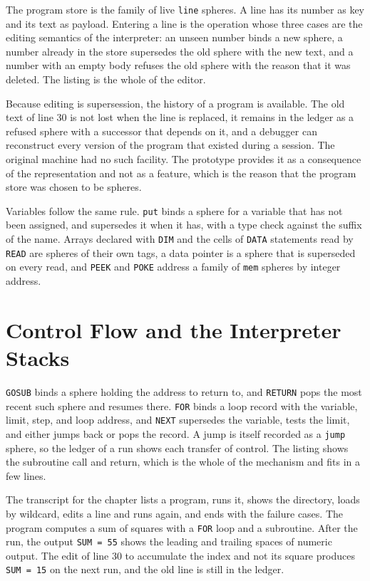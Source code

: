 The program store is the family of live \texttt{line} spheres. A line has its number as key and its text as payload. Entering a line is the operation whose three cases are the editing semantics of the interpreter: an unseen number binds a new sphere, a number already in the store supersedes the old sphere with the new text, and a number with an empty body refuses the old sphere with the reason that it was deleted. The listing is the whole of the editor.


Because editing is supersession, the history of a program is available. The old text of line 30 is not lost when the line is replaced, it remains in the ledger as a refused sphere with a successor that depends on it, and a debugger can reconstruct every version of the program that existed during a session. The original machine had no such facility. The prototype provides it as a consequence of the representation and not as a feature, which is the reason that the program store was chosen to be spheres.

Variables follow the same rule. \texttt{put} binds a sphere for a variable that has not been assigned, and supersedes it when it has, with a type check against the suffix of the name. Arrays declared with \texttt{DIM} and the cells of \texttt{DATA} statements read by \texttt{READ} are spheres of their own tags, a data pointer is a sphere that is superseded on every read, and \texttt{PEEK} and \texttt{POKE} address a family of \texttt{mem} spheres by integer address.

\section{Control Flow and the Interpreter Stacks}

\texttt{GOSUB} binds a sphere holding the address to return to, and \texttt{RETURN} pops the most recent such sphere and resumes there. \texttt{FOR} binds a loop record with the variable, limit, step, and loop address, and \texttt{NEXT} supersedes the variable, tests the limit, and either jumps back or pops the record. A jump is itself recorded as a \texttt{jump} sphere, so the ledger of a run shows each transfer of control. The listing shows the subroutine call and return, which is the whole of the mechanism and fits in a few lines.


The transcript for the chapter lists a program, runs it, shows the directory, loads by wildcard, edits a line and runs again, and ends with the failure cases. The program computes a sum of squares with a \texttt{FOR} loop and a subroutine. After the run, the output \texttt{SUM = 55} shows the leading and trailing spaces of numeric output. The edit of line 30 to accumulate the index and not its square produces \texttt{SUM = 15} on the next run, and the old line is still in the ledger.

